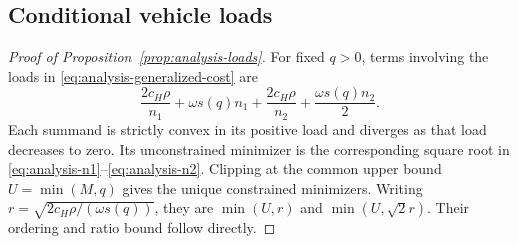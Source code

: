 \subsection{Conditional vehicle loads}

\begin{proof}[Proof of Proposition~\ref{prop:analysis-loads}]
For fixed $q>0$, terms involving the loads in
\eqref{eq:analysis-generalized-cost} are
\[
 \frac{2c_H\rho}{n_1}+\omega s(q)n_1
 +\frac{2c_H\rho}{n_2}+\frac{\omega s(q)n_2}2.
\]
Each summand is strictly convex in its positive load and diverges as that
load decreases to zero. Its unconstrained minimizer is the corresponding
square root in \eqref{eq:analysis-n1}--\eqref{eq:analysis-n2}. Clipping at
the common upper bound $U=\min(M,q)$ gives the unique constrained minimizers.
Writing $r=\sqrt{2c_H\rho/(\omega s(q))}$, they are $\min(U,r)$ and
$\min(U,\sqrt2r)$. Their ordering and ratio bound follow directly.
\end{proof}

